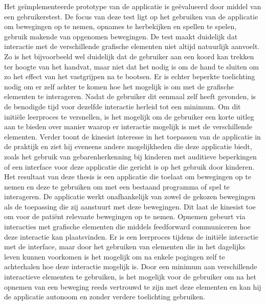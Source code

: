 Het ge\"implementeerde prototype van de applicatie is ge\"evalueerd door middel van een gebruikerstest. De focus van deze test ligt op het gebruiken van de applicatie om bewegingen op te nemen, opnames te herbekijken en spellen te spelen, gebruik makende van opgenomen bewegingen. De test maakt duidelijk dat interactie met de verschillende grafische elementen niet altijd natuurlijk aanvoelt. Zo is het bijvoorbeeld wel duidelijk dat de gebruiker aan een koord kan trekken ter hoogte van het handvat, maar niet dat het nodig is om de hand te sluiten om zo het effect van het vastgrijpen na te bootsen. Er is echter beperkte toelichting nodig om er zelf achter te komen hoe het mogelijk is om met de grafische elementen te interageren. Nadat de gebruiker dit eenmaal zelf heeft gevonden, is de benodigde tijd voor dezelfde interactie herleid tot een minimum. Om dit initi\"ele leerproces te versnellen, is het mogelijk om de gebruiker een korte uitleg aan te bieden over manier waarop er interactie mogelijk is met de verschillende elementen. Verder toont de kinesist interesse in het toepassen van de applicatie in de praktijk en ziet hij eveneens andere mogelijkheden die deze applicatie biedt, zoals het gebruik van gebarenherkenning bij kinderen met auditieve beperkingen of een interface voor deze applicatie die gericht is op het gebruik door kinderen.\\

Het resultaat van deze thesis is een applicatie die toelaat om bewegingen op te nemen en deze te gebruiken om met een bestaand programma of spel te interageren. De applicatie werkt onafhankelijk van zowel de gekozen bewegingen als de toepassing die zij aanstuurt met deze bewegingen. Dit laat de kinesist toe om voor de pati\"ent relevante bewegingen op te nemen. Opnemen gebeurt via interacties met grafische elementen die middels feedforward communiceren hoe deze interactie kan plaatsvinden. Er is een leerproces tijdens de initi\"ele interactie met de interface, maar door het gebruiken van elementen die in het dagelijks leven kunnen voorkomen is het mogelijk om na enkele pogingen zelf te achterhalen hoe deze interactie mogelijk is. Door een minimum aan verschillende interactieve elementen te gebruiken, is het mogelijk voor de gebruiker om na het opnemen van een beweging reeds vertrouwd te zijn met deze elementen en kan hij de applicatie autonoom en zonder verdere toelichting gebruiken.

